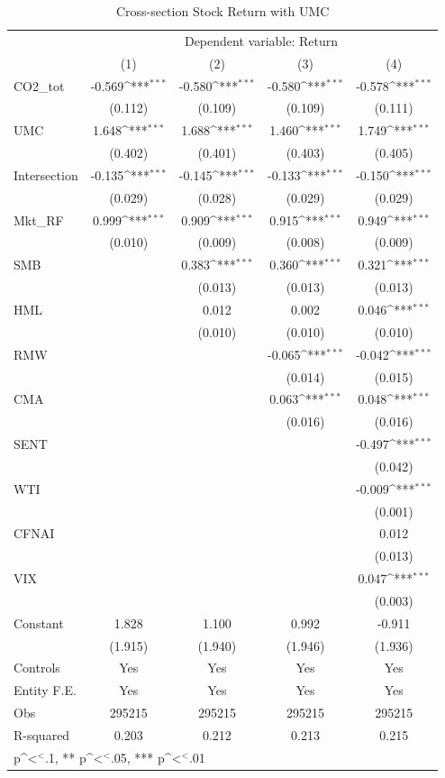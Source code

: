 \documentclass[12pt]{article}
\begin{document}
\begin{table}[H]
\centering
\footnotesize
\caption{Cross-section Stock Return with UMC}
\label{tab: firm_umc}
{
\def\sym#1{\ifmmode^{#1}\else\(^{#1}\)\fi}
\begin{tabular}{@{\extracolsep{2pt}}l*{4}{c}@{}}
\toprule

& \multicolumn{4}{c}{Dependent variable: Return} \\
\cline{2-5}
 & (1) & (2) & (3) & (4) \\
\hline
CO2\_tot & -0.569\sym{***} & -0.580\sym{***} & -0.580\sym{***} & -0.578\sym{***} \\
 & (0.112) & (0.109) & (0.109) & (0.111) \\
UMC & 1.648\sym{***} & 1.688\sym{***} & 1.460\sym{***} & 1.749\sym{***} \\
 & (0.402) & (0.401) & (0.403) & (0.405) \\
Intersection & -0.135\sym{***} & -0.145\sym{***} & -0.133\sym{***} & -0.150\sym{***} \\
 & (0.029) & (0.028) & (0.029) & (0.029) \\
Mkt\_RF & 0.999\sym{***} & 0.909\sym{***} & 0.915\sym{***} & 0.949\sym{***} \\
 & (0.010) & (0.009) & (0.008) & (0.009) \\
SMB &  & 0.383\sym{***} & 0.360\sym{***} & 0.321\sym{***} \\
 &  & (0.013) & (0.013) & (0.013) \\
HML &  & 0.012 & 0.002 & 0.046\sym{***} \\
 &  & (0.010) & (0.010) & (0.010) \\
RMW &  &  & -0.065\sym{***} & -0.042\sym{***} \\
 &  &  & (0.014) & (0.015) \\
CMA &  &  & 0.063\sym{***} & 0.048\sym{***} \\
 &  &  & (0.016) & (0.016) \\
SENT &  &  &  & -0.497\sym{***} \\
 &  &  &  & (0.042) \\
WTI &  &  &  & -0.009\sym{***} \\
 &  &  &  & (0.001) \\
CFNAI &  &  &  & 0.012 \\
 &  &  &  & (0.013) \\
VIX &  &  &  & 0.047\sym{***} \\
 &  &  &  & (0.003) \\
Constant & 1.828 & 1.100 & 0.992 & -0.911 \\
 & (1.915) & (1.940) & (1.946) & (1.936) \\

\hline
Controls & Yes & Yes & Yes & Yes \\
Entity F.E. & Yes & Yes & Yes & Yes \\
Obs & 295215 & 295215 & 295215 & 295215 \\
R-squared & 0.203 & 0.212 & 0.213 & 0.215 \\
\bottomrule
\multicolumn{5}{l}{\footnotesize * p\sym{<}.1, ** p\sym{<}.05, *** p\sym{<}.01}
\end{tabular}
}
\end{table}
\end{document}
